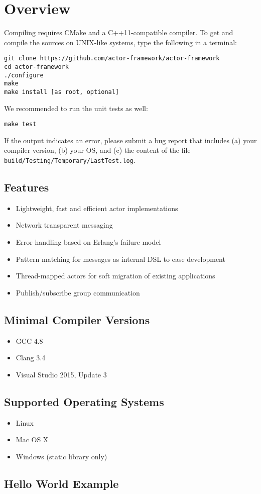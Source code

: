\section{Overview}

Compiling \lib requires CMake and a C++11-compatible compiler. To get and
compile the sources on UNIX-like systems, type the following in a terminal:

\begin{verbatim}
git clone https://github.com/actor-framework/actor-framework
cd actor-framework
./configure
make
make install [as root, optional]
\end{verbatim}

We recommended to run the unit tests as well:

\begin{verbatim}
make test
\end{verbatim}

If the output indicates an error, please submit a bug report that includes (a)
your compiler version, (b) your OS, and (c) the content of the file
\texttt{build/Testing/Temporary/LastTest.log}.

\subsection{Features}

\begin{itemize}
  \item Lightweight, fast and efficient actor implementations
  \item Network transparent messaging
  \item Error handling based on Erlang's failure model
  \item Pattern matching for messages as internal DSL to ease development
  \item Thread-mapped actors for soft migration of existing applications
  \item Publish/subscribe group communication
\end{itemize}


\subsection{Minimal Compiler Versions}

\begin{itemize}
  \item GCC 4.8
  \item Clang 3.4
  \item Visual Studio 2015, Update 3
\end{itemize}

\subsection{Supported Operating Systems}

\begin{itemize}
\item Linux
\item Mac OS X
\item Windows (static library only)
\end{itemize}

\clearpage
\subsection{Hello World Example}

